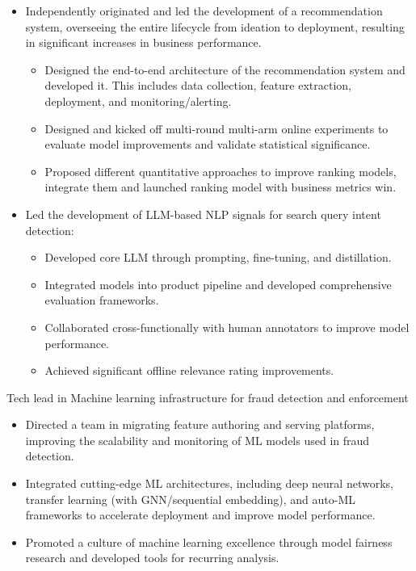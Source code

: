 \documentclass[line,margin]{res}
\begin{document}
\begin{resume}
\begin{itemize}
    \item Independently originated and led the development of a recommendation system, overseeing the entire lifecycle from ideation to deployment, resulting in significant increases in business performance.
        \begin{itemize}\itemsep -2pt
        \item Designed the end-to-end architecture of the recommendation system and developed it. This includes data collection, feature extraction, deployment, and monitoring/alerting.
        \item Designed and kicked off multi-round multi-arm online experiments to evaluate model improvements and validate statistical significance.
        \item Proposed different quantitative approaches to improve ranking models, integrate them and launched ranking model with business metrics win. 
    \end{itemize}
    
    
    \item Led the development of LLM-based NLP signals for search query intent detection:
    \begin{itemize}\itemsep -2pt
        \item Developed core LLM through prompting, fine-tuning, and distillation.
        \item Integrated models into product pipeline and developed comprehensive evaluation frameworks.
        \item Collaborated cross-functionally with human annotators to improve model performance.
        \item Achieved significant offline relevance rating improvements.
    \end{itemize}
\end{itemize}

Tech lead in Machine learning infrastructure for fraud detection and enforcement
\begin{itemize}\itemsep -2pt
    \item Directed a team in migrating feature authoring and serving platforms, improving the scalability and monitoring of ML models used in fraud detection.
    \item Integrated cutting-edge ML architectures, including deep neural networks, transfer learning (with GNN/sequential embedding), and auto-ML frameworks to accelerate deployment and improve model performance.
    \item Promoted a culture of machine learning excellence through model fairness research and developed tools for recurring analysis.
\end{itemize}


\end{resume}
\end{document}
